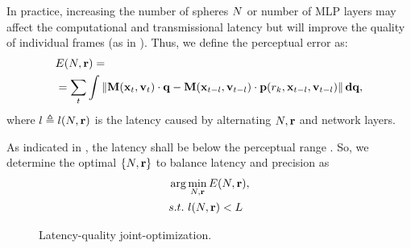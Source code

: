In practice, increasing the number of spheres $N$ or number of MLP layers may affect the computational and transmissional latency but will improve the quality of individual frames (as in ). Thus, we define the perceptual error as:
\begin{equation}
\begin{aligned}
&E(N, \mathbf{r}) = \\
&= \sum_t\int \left\lVert\mathbf{M}(\mathbf{x}_t,\mathbf{v}_t)\cdot\mathbf{q}-\mathbf{M}(\mathbf{x}_{t-l},\mathbf{v}_{t-l})\cdot\mathbf{p}(r_k,\mathbf{x}_{t-l},\mathbf{v}_{t-l})\right\rVert\mathbf{d}\mathbf{q},
\end{aligned}
\end{equation}
where $l\triangleq l(N, \mathbf{r})$ is the latency caused by alternating  $N, \mathbf{r}$ and network layers.

As indicated in \cite{albert2017latency}, the latency shall be below the perceptual range . So, we determine the optimal $\{N, \mathbf{r}\}$ to balance latency and precision as
\begin{equation}
\begin{aligned}
    &\arg\min_{N, \mathbf{r}} E(N, \mathbf{r}), \\
    & s.t.\ {l(N, \mathbf{r})} < L
\end{aligned}
\end{equation}


\begin{figure}
    \centering
    \caption{Latency-quality joint-optimization.}
    \label{fig:optimization}
\end{figure}

